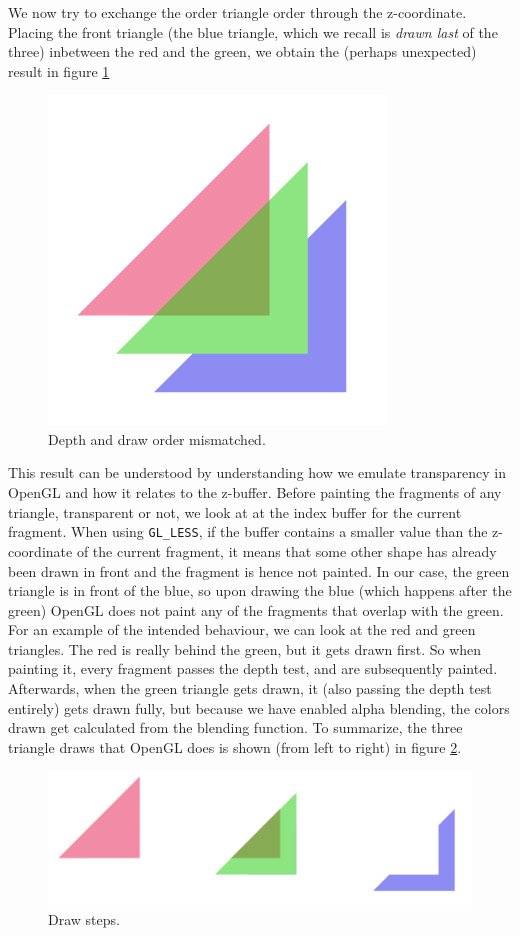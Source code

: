 \documentclass[]{article}
\begin{document}
\begin{multicols}{2}
\subsubsection{}
We now try to exchange the order triangle order through the z-coordinate. Placing the front triangle (the blue triangle, which we recall is \textit{drawn last} of the three) inbetween the red and the green, we obtain the (perhaps unexpected) result in figure \ref{fig:overlap3}
\begin{figure}[H]
\centering
\includegraphics[width=0.5\columnwidth]{overlap3.png}
\caption{Depth and draw order mismatched.}
\label{fig:overlap3}
\end{figure}
This result can be understood by understanding how we emulate transparency in OpenGL and how it relates to the z-buffer. Before painting the fragments of any triangle, transparent or not, we look at at the index buffer for the current fragment. When using \texttt{GL\_LESS}, if the buffer contains a smaller value than the z-coordinate of the current fragment, it means that some other shape has already been drawn in front and the fragment is hence not painted. In our case, the green triangle is in front of the blue, so upon drawing the blue (which happens after the green) OpenGL does not paint any of the fragments that overlap with the green. For an example of the intended behaviour, we can look at the red and green triangles. The red is really behind the green, but it gets drawn first. So when painting it, every fragment passes the depth test, and are subsequently painted. Afterwards, when the green triangle gets drawn, it (also passing the depth test entirely) gets drawn fully, but because we have enabled alpha blending, the colors drawn get calculated from the blending function. To summarize, the three triangle draws that OpenGL does is shown (from left to right) in figure \ref{fig:steps}.
\begin{figure}[H]
\centering
\includegraphics[width=\columnwidth]{steps.png}
\caption{Draw steps.}
\label{fig:steps}
\end{figure}

\end{multicols}
\appendix
\end{document}
